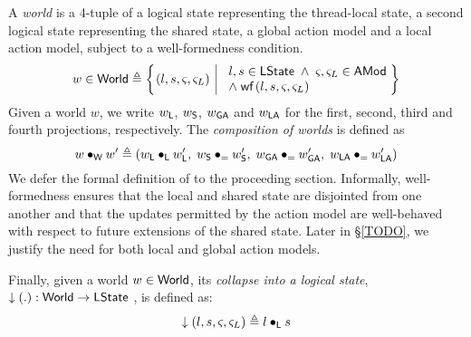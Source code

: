 %
%
\begin{definition}[Worlds]
A \emph{world} is a 4-tuple of a logical state representing the thread-local state, a second logical state representing the shared state, a global action model and a local action model, subject to a well-formedness condition.
%
\[
	w \in \Worlds \eqdef 
	\left\{
	\hspace*{-0.15cm}
	\begin{array}{l | l}
		(l, s, \amod{}, \amod{L}) & 
 		\begin{array}{l}
	 		l, s \in \LStates \;\land\; \amod{}, \amod{L} \in \AMods\\
	 		\land\; \wf{l, s, \amod{}, \amod{L}} 
	 	\end{array}
	 	\hspace*{-0.1cm}
	\end{array} 
	\hspace*{-0.15cm}
	\right\}
\]
% 
Given a world $w$, we write $w_{\textsf{L}}$, $w_{\textsf{S}}$, $w_{\textsf{GA}}$ and $w_{\textsf{LA}}$ for the first, second, third and fourth projections, respectively.
The \emph{composition of worlds} is defined as
%
\[
	w \bullet_{\textsf{W}} w' \triangleq (w_{\textsf{L}} \bullet_{\textsf{L}} w'_{\textsf{L}},\; w_{\textsf{S}} \bullet_{=} w'_{\textsf{S}},\; w_{\textsf{GA}} \bullet_{=} w'_{\textsf{GA}},\; w_{\textsf{LA}} \bullet_{=} w'_{\textsf{LA}})
\]
%
We defer the formal definition of  to the proceeding section. Informally, well-formedness ensures that the local and shared state are disjointed from one another and that the updates permitted by the action model are well-behaved with respect to future extensions of the shared state. Later in \S\ref{TODO}, we justify the need for both local and global action models.

Finally, given a world $w \in \textsf{World}$, its \emph{collapse into a logical state},
%
$
	\downarrow\left(.\right): \textsf{World} \rightarrow \textsf{LState}
$
%
, is defined as:
%
\[
	\downarrow\left(l, s, \varsigma_{}, \varsigma_{L}\right) \triangleq l \bullet_{\textsf{L}} s
\]
%
\end{definition}
%
%
%
%
